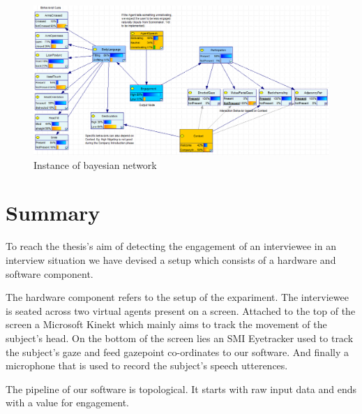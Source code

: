 \documentclass[12pt, a4paper, fleqn]{memoir}%
\begin{document}
\begin{figure}[h!]
    \centering
    \includegraphics[width=1\textwidth]{BN_state}
    \caption{Instance of bayesian network}
    \label{fig:BN_state}
\end{figure}


\chapter{Summary}
\label{Summary}
To reach the thesis's aim of detecting the engagement of an interviewee in an interview situation we have devised a setup which consists of a hardware and software component.

The hardware component refers to the setup of the expariment. The interviewee is seated across two virtual agents present on a screen. Attached to the top of the screen a Microsoft Kinekt which mainly aims to track the movement of the subject's head. On the bottom of the screen lies an SMI Eyetracker used to track the subject's gaze and feed gazepoint co-ordinates to our software. And finally a microphone that is used to record the subject's speech utterences.

The pipeline of our software is topological. It starts with raw input data and ends with a value for engagement.



\end{document}
